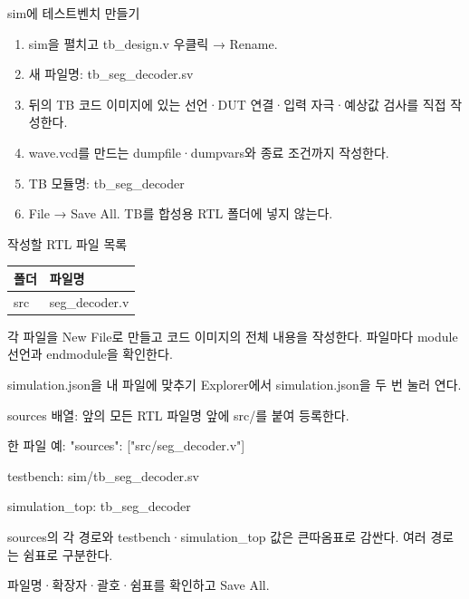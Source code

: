 \begin{frame}{sim에 테스트벤치 만들기}\relax
\small
\begin{enumerate}\setlength{\itemsep}{0.22cm}
\item sim을 펼치고 tb\_design.v 우클릭 → Rename.
\item 새 파일명: tb\_seg\_decoder.sv
\item 뒤의 TB 코드 이미지에 있는 선언·DUT 연결·입력 자극·예상값 검사를 직접 작성한다.
\item wave.vcd를 만드는 dumpfile·dumpvars와 종료 조건까지 작성한다.
\item TB 모듈명: tb\_seg\_decoder
\item File → Save All. TB를 합성용 RTL 폴더에 넣지 않는다.
\end{enumerate}

\end{frame}

\begin{frame}{작성할 RTL 파일 목록}\relax
\small
\begin{center}\renewcommand{\arraystretch}{1.45}
\begin{tabular}{l|l}
폴더 & 파일명\\\hline
src & seg\_decoder.v\\
\end{tabular}\end{center}
각 파일을 New File로 만들고 코드 이미지의 전체 내용을 작성한다. 파일마다 module 선언과 endmodule을 확인한다.\par
\end{frame}

\begin{frame}{simulation.json을 내 파일에 맞추기}\relax
\small
Explorer에서 simulation.json을 두 번 눌러 연다.\par\vspace{0.22cm}sources 배열: 앞의 모든 RTL 파일명 앞에 src/를 붙여 등록한다.\par\vspace{0.22cm}한 파일 예: "sources": ["src/seg\_decoder.v"]\par\vspace{0.22cm}testbench: sim/tb\_seg\_decoder.sv\par\vspace{0.22cm}simulation\_top: tb\_seg\_decoder\par\vspace{0.22cm}sources의 각 경로와 testbench·simulation\_top 값은 큰따옴표로 감싼다. 여러 경로는 쉼표로 구분한다.\par\vspace{0.22cm}파일명·확장자·괄호·쉼표를 확인하고 Save All.\par
\end{frame}

